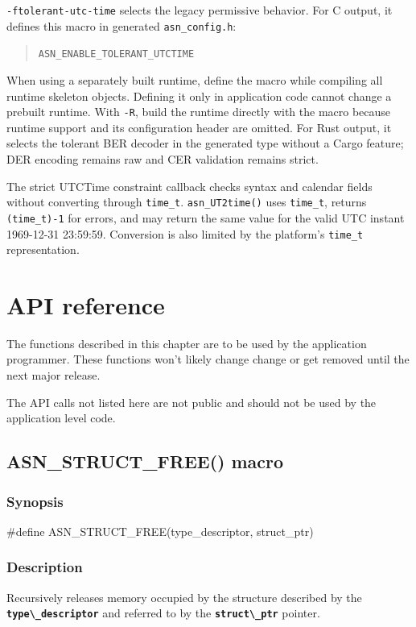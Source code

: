 \documentclass[english,oneside,12pt]{book}
\newcommand{\apisection}[2]{\clearpage\section{\label{#1}#2}}
\newcommand{\code}[1]{\texttt{\textbf{\lstinline{#1}}}}
\begin{document}
\texttt{-ftolerant-utc-time} selects the legacy permissive behavior. For C
output, it defines this macro in generated \texttt{asn\_config.h}:
\begin{quote}
\texttt{ASN\_\allowbreak{}ENABLE\_\allowbreak{}TOLERANT\_\allowbreak{}UTCTIME}
\end{quote}
When using a separately built runtime, define the macro while compiling all
runtime skeleton objects. Defining it only in application code cannot change
a prebuilt runtime. With \texttt{-R}, build the runtime directly with the
macro because runtime support and its configuration header are omitted. For
Rust output, it selects the tolerant BER decoder in the generated type without
a Cargo feature; DER encoding remains raw and CER validation remains strict.

The strict UTCTime constraint callback checks syntax and calendar fields
without converting through \texttt{time\_t}. \texttt{asn\_UT2time()} uses
\texttt{time\_t}, returns \texttt{(time\_t)-1} for errors, and may return the
same value for the valid UTC instant 1969-12-31 23:59:59. Conversion is also
limited by the platform's \texttt{time\_t} representation.


\chapter{API reference}

The functions described in this chapter are to be used by the application
programmer. These functions won't likely change change or get removed until
the next major release.

The API calls not listed here are not public and should not be used by the
application level code.

\apisection{sec:ASN_STRUCT_FREE}{ASN\_STRUCT\_FREE() macro}

\subsection*{Synopsis}

\begin{signature}
#define ASN_STRUCT_FREE(type_descriptor, struct_ptr)
\end{signature}

\subsection*{Description}

Recursively releases memory occupied by the structure
described by the \code{type\_descriptor} and referred to
by the \code{struct\_ptr} pointer.
\end{document}

